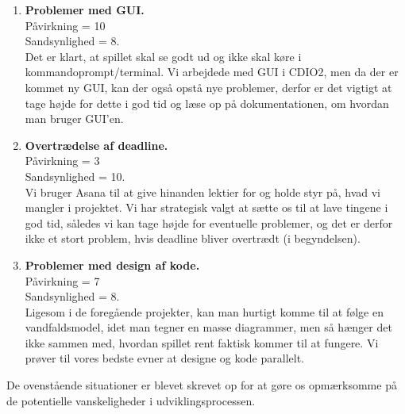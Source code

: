 \begin{enumerate}
    \item \textbf{Problemer med GUI.} \\
    Påvirkning = 10\\ Sandsynlighed = 8.\\
    Det er klart, at spillet skal se godt ud og ikke skal køre i kommandoprompt/terminal.
    Vi arbejdede med GUI i CDIO2, men da der er kommet ny GUI, kan der også opstå nye problemer, derfor er det vigtigt at tage højde for dette i god tid og læse op på dokumentationen, om hvordan man bruger GUI'en.
    \item \textbf{Overtrædelse af deadline.} \\
    Påvirkning = 3\\ Sandsynlighed = 10.\\
    Vi bruger Asana til at give hinanden lektier for og holde styr på, hvad vi mangler i projektet.
    Vi har strategisk valgt at sætte os til at lave tingene i god tid, således vi kan tage højde for eventuelle problemer, og det er derfor ikke et stort problem, hvis deadline bliver overtrædt (i begyndelsen).
    \item \textbf{Problemer med design af kode.} \\
    Påvirkning = 7\\ Sandsynlighed = 8.\\
    Ligesom i de foregående projekter, kan man hurtigt komme til at følge en vandfaldsmodel, idet man tegner en masse diagrammer, men så hænger det ikke sammen med, hvordan spillet rent faktisk kommer til at fungere.
    Vi prøver til vores bedste evner at designe og kode parallelt.
    
\end{enumerate}

De ovenstående situationer er blevet skrevet op for at gøre os opmærksomme på de potentielle vanskeligheder i udviklingsprocessen.

